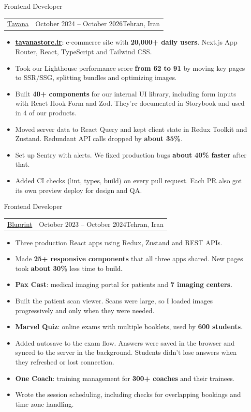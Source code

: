 \documentclass[a4paper,10pt]{article}
\makeatletter
\newcommand{\jobtitlefont}{\intermedium\fontsize{10.78pt}{14pt}\selectfont}
\newcommand{\companyfont}{\intersemibold\fontsize{9.51pt}{12pt}\selectfont}
\newcommand{\metafont}{\fontsize{7.61pt}{10pt}\selectfont}
\newcommand{\headersep}{\hspace{0.5em}\textcolor{titleblue}{\textbar}\hspace{0.5em}}
\newcommand{\jobsep}{%
  \par\vspace{2.8mm}%
  \noindent\textcolor{linegray}{\hdashrule{\textwidth}{0.7pt}{2.2pt 1.8pt}}%
  \par\vspace{2.8mm}%
}
\newcommand{\resumeSubheading}[4]{%
    \item[]
  {\jobtitlefont\color{headingnavy}#3}\\[2pt]
  \begin{tabular*}{\textwidth}{@{}l@{\extracolsep{\fill}}r@{}}
    {\companyfont\textcolor{titleblue}{#1}} &
    {\metafont\textcolor{metagray}{%
      #4\headersep #2}}
  \end{tabular*}%
}
\newcommand{\resumeItemListStart}{%
    \begin{itemize}[leftmargin=1.4em, labelsep=0.6em, itemsep=1.1mm, topsep=2.2mm, parsep=0pt]%
}
\newcommand{\resumeItemListEnd}{\end{itemize}}
\makeatother
\begin{document}
\resumeSubheading
  {\href{https://tavanastore.ir/}{Tavana}}{Tehran, Iran}
  {Frontend Developer}{October 2024 -- October 2026}
  \resumeItemListStart
    \item[] \href{https://tavanastore.ir/}{\textbf{tavanastore.ir}}: e-commerce site with \textbf{20,000+ daily users}. Next.js App Router, React, TypeScript and Tailwind CSS.
    \item Took our Lighthouse performance score \textbf{from 62 to 91} by moving key pages to SSR/SSG, splitting bundles and optimizing images.
    \item Built \textbf{40+ components} for our internal UI library, including form inputs with React Hook Form and Zod. They're documented in Storybook and used in 4 of our products.
    \item Moved server data to React Query and kept client state in Redux Toolkit and Zustand. Redundant API calls dropped by \textbf{about 35\%}.
    \item Set up Sentry with alerts. We fixed production bugs \textbf{about 40\% faster} after that.
    \item Added CI checks (lint, types, build) on every pull request. Each PR also got its own preview deploy for design and QA.
  \resumeItemListEnd

\jobsep

\resumeSubheading
  {\href{https://bluprint.ir/}{Bluprint}}{Tehran, Iran}
  {Frontend Developer}{October 2023 -- October 2024}
  \resumeItemListStart
    \item[] Three production React apps using Redux, Zustand and REST APIs.
    \item Made \textbf{25+ responsive components} that all three apps shared. New pages took \textbf{about 30\%} less time to build.
    \item[] \textbf{Pax Cast}: medical imaging portal for patients and \textbf{7 imaging centers}.
    \item Built the patient scan viewer. Scans were large, so I loaded images progressively and only when they were needed.
    \item[] \textbf{Marvel Quiz}: online exams with multiple booklets, used by \textbf{600 students}.
    \item Added autosave to the exam flow. Answers were saved in the browser and synced to the server in the background. Students didn't lose answers when they refreshed or lost connection.
    \item[] \textbf{One Coach}: training management for \textbf{300+ coaches} and their trainees.
    \item Wrote the session scheduling, including checks for overlapping bookings and time zone handling.
  \resumeItemListEnd
\end{document}
